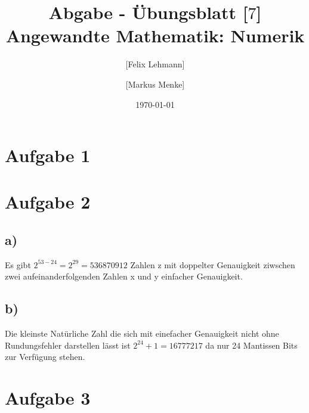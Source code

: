 \documentclass[10pt,a4paper]{article}
\begin{document}
\title{Abgabe - Übungsblatt [$7$]\\
\small{Angewandte Mathematik: Numerik}}
\author{ [Felix Lehmann] \and [Markus Menke]}
\date{\today}
\maketitle

\section*{Aufgabe 1}


\section*{Aufgabe 2}
\subsection*{a)}
Es gibt $2^{53-24}=2^{29}=536870912$ Zahlen z mit doppelter Genauigkeit ziwschen zwei aufeinanderfolgenden Zahlen x und y einfacher Genauigkeit.
\subsection*{b)}
Die kleinste Natürliche Zahl die sich mit einefacher Genauigkeit nicht ohne Rundungsfehler darstellen lässt ist $2^{24}+1 = 16777217$ da nur 24 Mantissen Bits zur Verfügung stehen.

\section*{Aufgabe 3}
\end{document}
